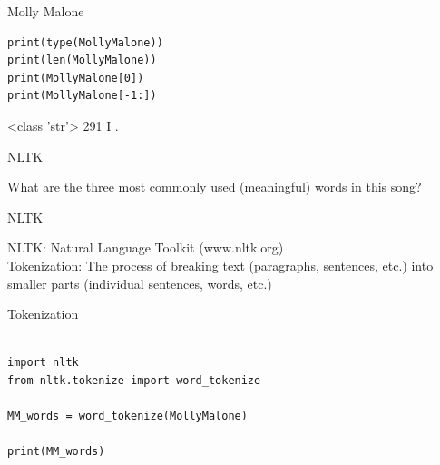 \documentclass[handout]{beamer}
\begin{document}
\begin{frame}[fragile]{Molly Malone}
	
\begin{lstlisting}
print(type(MollyMalone))
print(len(MollyMalone))
print(MollyMalone[0])
print(MollyMalone[-1:])
\end{lstlisting}
	
\begin{lstlistingoutput}
<class 'str'>
291
I
.
\end{lstlistingoutput}

\end{frame}


\begin{frame}[fragile]{NLTK}
	
What are the three most commonly used (meaningful) words in this song?
	
	
\end{frame}




\begin{frame}[fragile]{NLTK}
	

NLTK: Natural Language Toolkit (www.nltk.org) \\

Tokenization: The process of breaking text (paragraphs, sentences, etc.) into smaller parts (individual sentences, words, etc.)


\end{frame}



\begin{frame}[fragile]{Tokenization}
	
\begin{lstlisting}		

import nltk
from nltk.tokenize import word_tokenize

MM_words = word_tokenize(MollyMalone)

print(MM_words)
\end{lstlisting}
	
\begin{lstlistingoutput}
\end{lstlistingoutput}


\end{frame}
\end{document}
